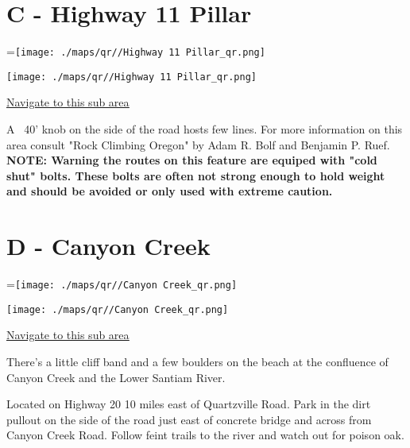 \begin{multicols}{2}
\needspace{6em}

\section{C - Highway 11 Pillar}\label{sa:Highway 11 Pillar}
=\hbox{\texttt{[image: ./maps/qr//Highway 11 Pillar\_qr.png]}}%
\begin{center}
\texttt{[image: ./maps/qr//Highway 11 Pillar\_qr.png]}
\end{center}
\begin{center}
\underline{\textcolor{blue}{\href{http://maps.google.com/maps?q=44.50089,-122.47419}{Navigate to this sub area}}}
\end{center}


A ~40' knob on the side of the road hosts few lines. For more information on this area consult "Rock Climbing Oregon" by  Adam R. Bolf and Benjamin P. Ruef.\\
\textbf{NOTE: Warning the routes on this feature are equiped with "cold shut" bolts. These bolts are often not strong enough to hold weight and should be avoided or only used with extreme caution.}\\




\needspace{6em}

\section{D - Canyon Creek}\label{sa:Canyon Creek}
=\hbox{\texttt{[image: ./maps/qr//Canyon Creek\_qr.png]}}%
\begin{center}
\texttt{[image: ./maps/qr//Canyon Creek\_qr.png]}
\end{center}
\begin{center}
\underline{\textcolor{blue}{\href{http://maps.google.com/maps?q=44.39708529718213,-122.44671253776127}{Navigate to this sub area}}}
\end{center}


There's a little cliff band and a few boulders on the beach at the confluence of Canyon Creek and the Lower Santiam River.

Located on Highway 20 10 miles east of Quartzville Road. Park in the dirt pullout on the side of the road just east of concrete bridge and across from Canyon Creek Road. Follow feint trails to the river and watch out for poison oak.\\





\end{multicols}
